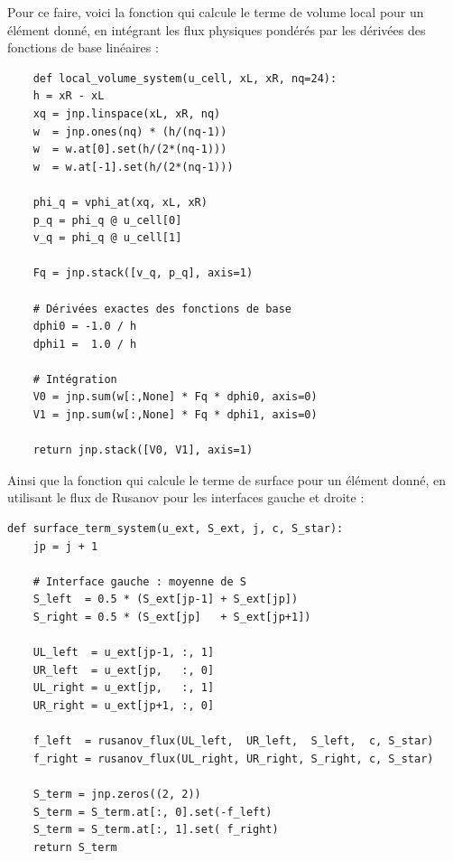 \documentclass[12pt,a4paper]{article}
\begin{document}
Pour ce faire, voici la fonction qui calcule le terme de volume local pour un élément donné, en intégrant les flux physiques pondérés par les dérivées des fonctions de base linéaires :
\begin{verbatim}
    def local_volume_system(u_cell, xL, xR, nq=24):
    h = xR - xL
    xq = jnp.linspace(xL, xR, nq)
    w  = jnp.ones(nq) * (h/(nq-1))
    w  = w.at[0].set(h/(2*(nq-1)))
    w  = w.at[-1].set(h/(2*(nq-1)))

    phi_q = vphi_at(xq, xL, xR)
    p_q = phi_q @ u_cell[0]
    v_q = phi_q @ u_cell[1]

    Fq = jnp.stack([v_q, p_q], axis=1)

    # Dérivées exactes des fonctions de base
    dphi0 = -1.0 / h
    dphi1 =  1.0 / h

    # Intégration
    V0 = jnp.sum(w[:,None] * Fq * dphi0, axis=0)
    V1 = jnp.sum(w[:,None] * Fq * dphi1, axis=0)

    return jnp.stack([V0, V1], axis=1)  
\end{verbatim}

Ainsi que la fonction qui calcule le terme de surface pour un élément donné, en utilisant le flux de Rusanov pour les interfaces gauche et droite :
\begin{verbatim}
def surface_term_system(u_ext, S_ext, j, c, S_star):
    jp = j + 1

    # Interface gauche : moyenne de S
    S_left  = 0.5 * (S_ext[jp-1] + S_ext[jp])
    S_right = 0.5 * (S_ext[jp]   + S_ext[jp+1])

    UL_left  = u_ext[jp-1, :, 1]
    UR_left  = u_ext[jp,   :, 0]
    UL_right = u_ext[jp,   :, 1]
    UR_right = u_ext[jp+1, :, 0]

    f_left  = rusanov_flux(UL_left,  UR_left,  S_left,  c, S_star)
    f_right = rusanov_flux(UL_right, UR_right, S_right, c, S_star)

    S_term = jnp.zeros((2, 2))
    S_term = S_term.at[:, 0].set(-f_left)
    S_term = S_term.at[:, 1].set( f_right)
    return S_term
\end{verbatim}
\end{document}
